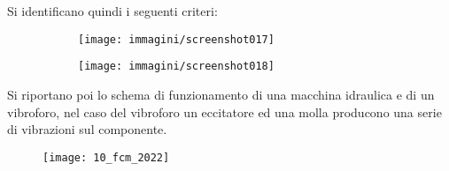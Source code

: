 \documentclass{article}
\begin{document}
\begin{adjustwidth}{2in}{}
		  Si identificano quindi i seguenti criteri:
		  
\begin{figure}[H]
	\centering
	\begin{subfigure}{0.5\textwidth}
		\centering
		\texttt{[image: immagini/screenshot017]}
		\label{fig:screenshot017}
	\end{subfigure}%
	\begin{subfigure}{0.5\textwidth}
		\centering
		\texttt{[image: immagini/screenshot018]}
		\label{fig:screenshot018}
	\end{subfigure}
\end{figure}
		  			  
		  Si riportano poi lo schema di funzionamento di una macchina idraulica e di un vibroforo, nel caso del vibroforo un eccitatore ed una molla producono una serie di vibrazioni sul componente. 
		  
		  		\end{adjustwidth}
		  \begin{figure}[H]
		  \texttt{[image: 10\_fcm\_2022]}
		  \end{figure}
\end{document}
